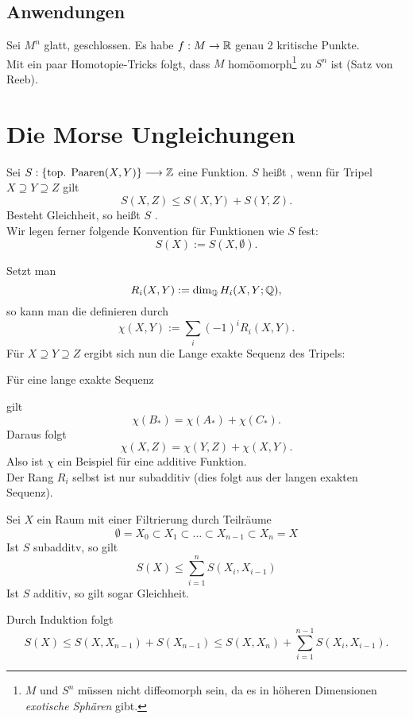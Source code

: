 
\subsection{Anwendungen}
Sei $M^n$ glatt, geschlossen. Es habe $f : M \overset{}{\rightarrow} \mathbb{R}$ genau 2 kritische Punkte.\\
Mit ein paar Homotopie-Tricks folgt, dass $M$ homöomorph\footnote{$M$ und $S^n$ müssen nicht diffeomorph sein, da es in höheren Dimensionen \textsl{exotische Sphären} gibt.} zu $S^n$ ist (Satz von Reeb).

\section{Die Morse Ungleichungen}

\Def{}
Sei $S: \{ \text{top. Paaren} (X,Y) \} \overset{}{\longrightarrow} \mathbb{Z}$ eine Funktion. $S$ heißt , wenn für Tripel $X \supseteq Y \supseteq Z$ gilt
\[ S(X,Z) \leq S(X,Y) + S(Y,Z). \]
Besteht Gleichheit, so heißt $S$ .\\
Wir legen ferner folgende Konvention für Funktionen wie $S$ fest:
\[ S(X) := S(X,\emptyset). \]

\Bsp{}
Setzt man
\[  R_i(X,Y) := \dim_{\mathbb{Q}} H_i(X,Y; \mathbb{Q}), \]
so kann man die  definieren durch
\[ \chi(X,Y) := \sum_{i} (-1)^i R_i(X,Y). \]
Für  $X \supseteq Y \supseteq Z$ ergibt sich nun die Lange exakte Sequenz des Tripels:
\begin{center}
\end{center}
Für eine lange exakte Sequenz
\begin{center}
\end{center}
gilt
\[ \chi(B_*) = \chi(A_*) + \chi(C_*). \]
Daraus folgt
\[ \chi(X,Z) = \chi(Y,Z) + \chi(X,Y). \]
Also ist $\chi$ ein Beispiel für eine additive Funktion.\\
Der Rang $R_i$ selbst ist nur subadditiv (dies folgt aus der langen exakten Sequenz).

\Lem{}
Sei $X$ ein Raum mit einer Filtrierung durch Teilräume
\[ \emptyset = X_0 \subset X_1 \subset \ldots \subset X_{n-1} \subset X_n = X \]
Ist $S$ subadditv, so gilt
\[ S(X) \leq \sum_{i = 1}^nS(X_i, X_{i-1}) \]
Ist $S$ additiv, so gilt sogar Gleichheit.
\begin{Beweis}{}
Durch Induktion folgt
\[ S(X) \leq S(X, X_{n-1}) + S(X_{n-1}) \leq S(X,X_n) + \sum_{i = 1}^{n-1} S(X_i, X_{i-1}). \]
\end{Beweis}


